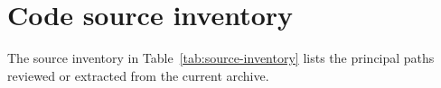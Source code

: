\section{Code source inventory}
\label{sec:source-inventory}
The source inventory in Table~\ref{tab:source-inventory} lists the principal paths reviewed or extracted from the current archive.


